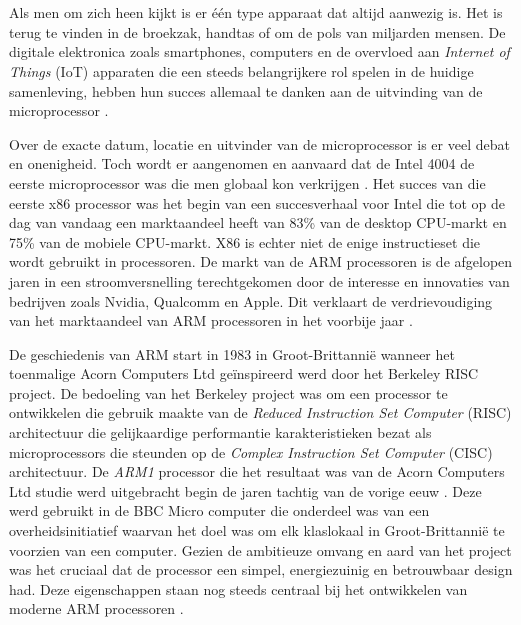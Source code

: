 
\chapter{}
\label{ch:inleiding}

Als men om zich heen kijkt is er één type apparaat dat altijd aanwezig is. Het is terug te vinden in de broekzak, handtas of om de pols van miljarden mensen. De digitale elektronica zoals smartphones, computers en de overvloed aan \textit{Internet of Things} (IoT) apparaten die een steeds belangrijkere rol spelen in de huidige samenleving, hebben hun succes allemaal te danken aan de uitvinding van de microprocessor \autocite{Malone1998}. 

Over de exacte datum, locatie en uitvinder van de microprocessor is er veel debat en onenigheid. Toch wordt er aangenomen en aanvaard dat de Intel 4004 de eerste microprocessor was die men globaal kon verkrijgen \autocite{Aspray1997}. Het succes van die eerste x86 processor was het begin van een succesverhaal voor Intel die tot op de dag van vandaag een marktaandeel heeft van 83\% van de desktop CPU-markt en 75\% van de mobiele CPU-markt. X86 is echter niet de enige instructieset die wordt gebruikt in processoren. De markt van de ARM processoren is de afgelopen jaren in een stroomversnelling terechtgekomen door de interesse en innovaties van bedrijven zoals Nvidia, Qualcomm en Apple. Dit verklaart de verdrievoudiging van het marktaandeel van ARM processoren in het voorbije jaar \autocite{King2022}.

De geschiedenis van ARM start in 1983 in Groot-Brittannië wanneer het toenmalige Acorn Computers Ltd geïnspireerd werd door het Berkeley RISC project. De bedoeling van het Berkeley project was om een processor te ontwikkelen die gebruik maakte van de \textit{Reduced Instruction Set Computer} (RISC) architectuur die gelijkaardige performantie karakteristieken bezat als microprocessors die steunden op de \textit{Complex Instruction Set Computer} (CISC) architectuur. De \textit{ARM1} processor die het resultaat was van de Acorn Computers Ltd studie werd uitgebracht begin de jaren tachtig van de vorige eeuw \autocite{Ahammed2017}. Deze werd gebruikt in de BBC Micro computer die onderdeel was van een overheidsinitiatief waarvan het doel was om elk klaslokaal in Groot-Brittannië te voorzien van een computer. Gezien de ambitieuze omvang en aard van het project was het cruciaal dat de processor een simpel, energiezuinig en betrouwbaar design had. Deze eigenschappen staan nog steeds centraal bij het ontwikkelen van moderne ARM processoren \autocite{Walshe2015}.


